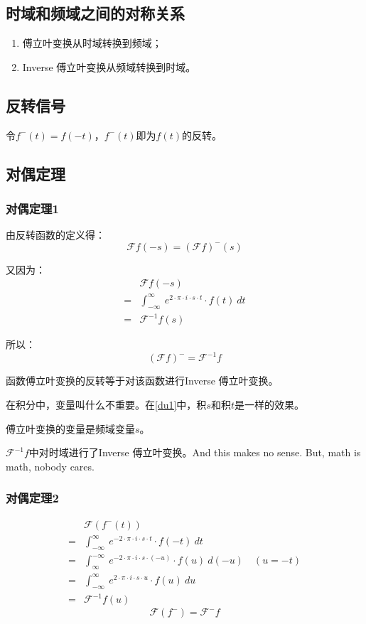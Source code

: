 \subsection{时域和频域之间的对称关系}
\begin{enumerate}
	\item 傅立叶变换从时域转换到频域；
	\item Inverse 傅立叶变换从频域转换到时域。
\end{enumerate}
\subsection{反转信号}
令$f^-(t)=f(-t)$，$f^-(t)$即为$f(t)$的反转。

\subsection{对偶定理}
\subsubsection{对偶定理1}
由反转函数的定义得：
$$
	\mathcal{F}f(-s)=(\mathcal{F}f)^-(s)
$$

又因为：
\begin{align*}
	  & \mathcal{F}f(-s)                                                           \\
	= & \int_{-\infty}^{\infty}\ e^{2\cdot \pi\cdot i\cdot s\cdot t}\cdot f(t)\ dt \\
	= & \mathcal{F}^{-1}f(s)
\end{align*}

所以：
\begin{equation}\label{du1}
	(\mathcal{F}f)^-=\mathcal{F}^{-1}f
\end{equation}

函数傅立叶变换的反转等于对该函数进行Inverse 傅立叶变换。

在积分中，变量叫什么不重要。在\ref{du1}中，积$s$和积$t$是一样的效果。

傅立叶变换的变量是频域变量$s$。

$\mathcal{F}^{-1}f$中对时域进行了Inverse 傅立叶变换。And this makes no sense. But, math is math, nobody cares.

\subsubsection{对偶定理2}
\begin{align*}
	  & \mathcal{F}(f^-(t))                                                                            \\
	= & \int_{-\infty}^{\infty}\ e^{-2\cdot \pi\cdot i\cdot s\cdot t}\cdot f(-t)\ dt                   \\
	= & \int_{\infty}^{-\infty}\ e^{-2\cdot \pi\cdot i\cdot s\cdot (-u)}\cdot f(u)\ d(-u) \quad (u=-t) \\
	= & \int_{-\infty}^{\infty}\ e^{2\cdot \pi\cdot i\cdot s\cdot u}\cdot f(u)\ du                     \\
	= & \mathcal{F}^{-1}f(u)
\end{align*}
\begin{equation}\label{du2}
	\mathcal{F}(f^-)=\mathcal{F}^-f
\end{equation}


